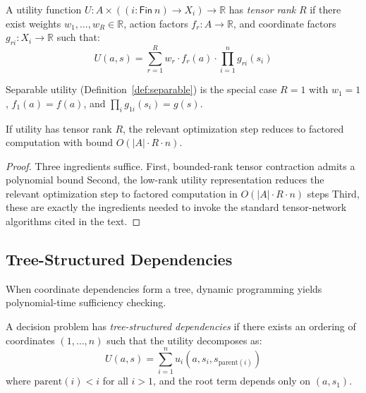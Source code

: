 \begin{definition}\label{def:tensor-rank}
A utility function $U : A \times ((i : \mathsf{Fin}\ n) \to X_i) \to \mathbb{R}$ has \emph{tensor rank} $R$ if there exist weights $w_1, \ldots, w_R \in \mathbb{R}$, action factors $f_r : A \to \mathbb{R}$, and coordinate factors $g_{ri} : X_i \to \mathbb{R}$ such that:
\[
U(a, s) = \sum_{r=1}^R w_r \cdot f_r(a) \cdot \prod_{i=1}^n g_{ri}(s_i)
\]
\end{definition}

\begin{remark}
Separable utility (Definition~\ref{def:separable}) is the special case $R = 1$ with $w_1 = 1$, $f_1(a) = f(a)$, and $\prod_i g_{1i}(s_i) = g(s)$.
\end{remark}

\begin{theorem}\label{thm:tensor-rank}
If utility has tensor rank $R$, the relevant optimization step reduces to factored computation with bound $O(|A| \cdot R \cdot n)$.
\end{theorem}


\begin{proof}
Three ingredients suffice. First, bounded-rank tensor contraction admits a polynomial bound  Second, the low-rank utility representation reduces the relevant optimization step to factored computation in $O(|A| \cdot R \cdot n)$ steps  Third, these are exactly the ingredients needed to invoke the standard tensor-network algorithms cited in the text.
\end{proof}

\subsection{Tree-Structured Dependencies}\label{sec:tract-tree}

When coordinate dependencies form a tree, dynamic programming yields polynomial-time sufficiency checking.

\begin{definition}\label{def:tree-struct}
A decision problem has \emph{tree-structured dependencies} if there exists an ordering of coordinates $(1, \ldots, n)$ such that the utility decomposes as:
\[
U(a, s) = \sum_{i=1}^n u_i(a, s_i, s_{\mathrm{parent}(i)})
\]
where $\mathrm{parent}(i) < i$ for all $i > 1$, and the root term depends only on $(a, s_1)$.
\end{definition}

